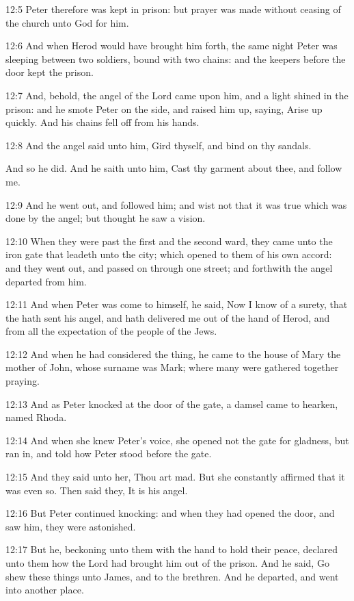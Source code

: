 12:5 Peter therefore was kept in prison: but prayer was made without
ceasing of the church unto God for him.

12:6 And when Herod would have brought him forth, the same night Peter
was sleeping between two soldiers, bound with two chains: and the
keepers before the door kept the prison.

12:7 And, behold, the angel of the Lord came upon him, and a light
shined in the prison: and he smote Peter on the side, and raised him
up, saying, Arise up quickly. And his chains fell off from his hands.

12:8 And the angel said unto him, Gird thyself, and bind on thy
sandals.

And so he did. And he saith unto him, Cast thy garment about thee, and
follow me.

12:9 And he went out, and followed him; and wist not that it was true
which was done by the angel; but thought he saw a vision.

12:10 When they were past the first and the second ward, they came
unto the iron gate that leadeth unto the city; which opened to them of
his own accord: and they went out, and passed on through one street;
and forthwith the angel departed from him.

12:11 And when Peter was come to himself, he said, Now I know of a
surety, that the \LORD hath sent his angel, and hath delivered me out
of the hand of Herod, and from all the expectation of the people of
the Jews.

12:12 And when he had considered the thing, he came to the house of
Mary the mother of John, whose surname was Mark; where many were
gathered together praying.

12:13 And as Peter knocked at the door of the gate, a damsel came to
hearken, named Rhoda.

12:14 And when she knew Peter's voice, she opened not the gate for
gladness, but ran in, and told how Peter stood before the gate.

12:15 And they said unto her, Thou art mad. But she constantly
affirmed that it was even so. Then said they, It is his angel.

12:16 But Peter continued knocking: and when they had opened the door,
and saw him, they were astonished.

12:17 But he, beckoning unto them with the hand to hold their peace,
declared unto them how the Lord had brought him out of the prison. And
he said, Go shew these things unto James, and to the brethren. And he
departed, and went into another place.

